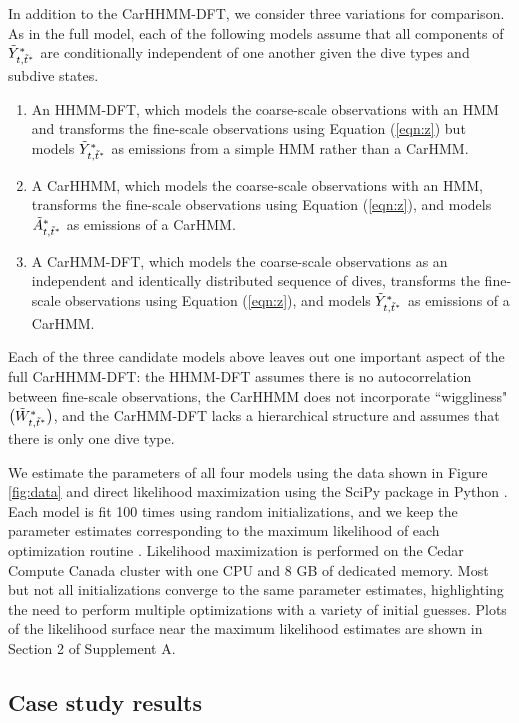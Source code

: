 In addition to the CarHHMM-DFT, we consider three variations for comparison. As in the full model, each of the following models assume that all components of $\tilde{Y}^*_{t,\tilde t^*}$ are conditionally independent of one another given the dive types and subdive states. 
\begin{enumerate}
    \item An HHMM-DFT, which models the coarse-scale observations with an HMM and transforms the fine-scale observations using Equation (\ref{eqn:z}) but models $\tilde{Y}^*_{t,\tilde t^*}$ as emissions from a simple HMM rather than a CarHMM.
    \item A CarHHMM, which models the coarse-scale observations with an HMM, transforms the fine-scale observations using Equation (\ref{eqn:z}), and models $\tilde{A}^*_{t,\tilde t^*}$ as emissions of a CarHMM.
    \item A CarHMM-DFT, which models the coarse-scale observations as an independent and identically distributed sequence of dives, transforms the fine-scale observations using Equation (\ref{eqn:z}), and models $\tilde{Y}^*_{t,\tilde t^*}$ as emissions of a CarHMM.
\end{enumerate}
%
Each of the three candidate models above leaves out one important aspect of the full CarHHMM-DFT: the HHMM-DFT assumes there is no autocorrelation between fine-scale observations, the CarHHMM does not incorporate ``wiggliness" $\big(\tilde{W}^*_{t,\tilde t^*}\big)$, and the CarHMM-DFT lacks a hierarchical structure and assumes that there is only one dive type.

We estimate the parameters of all four models using the data shown in Figure \ref{fig:data} and direct likelihood maximization using the SciPy package in Python \citep{Virtanen:2019}. Each model is fit 100 times using random initializations, and we keep the parameter estimates corresponding to the maximum likelihood of each optimization routine \citep{Zucchini:2016}. Likelihood maximization is performed on the Cedar Compute Canada cluster with one CPU and 8 GB of dedicated memory. Most but not all initializations converge to the same parameter estimates, highlighting the need to perform multiple optimizations with a variety of initial guesses. Plots of the likelihood surface near the maximum likelihood estimates are shown in Section 2 of Supplement A. 

\subsection{Case study results}

